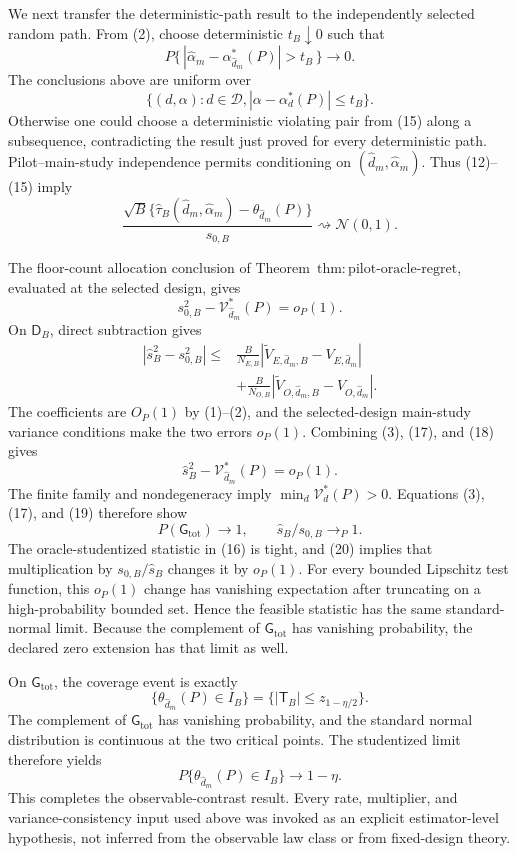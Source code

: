 We next transfer the deterministic-path result to the independently selected random path.  From (2), choose deterministic \(t_B\downarrow0\) such that
\[
 P\{\,|\widehat\alpha_m-\alpha_{\widehat d_m}^*(P)|>t_B\,\}
 \longrightarrow0.                                      \tag{14}
\]
The conclusions above are uniform over
\[
 \{(d,\alpha):d\in\mathcal D,
 |\alpha-\alpha_d^*(P)|\le t_B\}.                       \tag{15}
\]
Otherwise one could choose a deterministic violating pair from (15) along a subsequence, contradicting the result just proved for every deterministic path.  Pilot--main-study independence permits conditioning on \((\widehat d_m,\widehat\alpha_m)\).  Thus (12)--(15) imply
\[
 \frac{\sqrt B\{\widehat\tau_B(\widehat d_m,\widehat\alpha_m)
 -\theta_{\widehat d_m}(P)\}}{s_{0,B}}
 \rightsquigarrow\mathcal N(0,1).                       \tag{16}
\]

The floor-count allocation conclusion of Theorem~\(\mathrm{thm{:}pilot\text{-}oracle\text{-}regret}\), evaluated at the selected design, gives
\[
 s_{0,B}^2-\mathcal V_{\widehat d_m}^*(P)=o_P(1).        \tag{17}
\]
On \(\mathsf D_B\), direct subtraction gives
\[
\begin{aligned}
 |\widehat s_B^2-s_{0,B}^2|
 \le{}&\frac{B}{N_{E,B}}
 |\widetilde V_{E,\widehat d_m,B}-V_{E,\widehat d_m}|\\
 &+\frac{B}{N_{O,B}}
 |\widetilde V_{O,\widehat d_m,B}-V_{O,\widehat d_m}|. \tag{18}
\end{aligned}
\]
The coefficients are \(O_P(1)\) by (1)--(2), and the selected-design main-study variance conditions make the two errors \(o_P(1)\).  Combining (3), (17), and (18) gives
\[
 \widehat s_B^2-\mathcal V_{\widehat d_m}^*(P)=o_P(1).   \tag{19}
\]
The finite family and nondegeneracy imply \(\min_d\mathcal V_d^*(P)>0\).  Equations (3), (17), and (19) therefore show
\[
 P(\mathsf G_{\mathrm{tot}})\longrightarrow1,
 \qquad
 \widehat s_B/s_{0,B}\longrightarrow_P1.               \tag{20}
\]
The oracle-studentized statistic in (16) is tight, and (20) implies that multiplication by \(s_{0,B}/\widehat s_B\) changes it by \(o_P(1)\).  For every bounded Lipschitz test function, this \(o_P(1)\) change has vanishing expectation after truncating on a high-probability bounded set.  Hence the feasible statistic has the same standard-normal limit.  Because the complement of \(\mathsf G_{\mathrm{tot}}\) has vanishing probability, the declared zero extension has that limit as well.

On \(\mathsf G_{\mathrm{tot}}\), the coverage event is exactly
\[
 \{\theta_{\widehat d_m}(P)\in I_B\}
 =\{|\mathsf T_B|\le z_{1-\eta/2}\}.
\]
The complement of \(\mathsf G_{\mathrm{tot}}\) has vanishing probability, and the standard normal distribution is continuous at the two critical points.  The studentized limit therefore yields
\[
 P\{\theta_{\widehat d_m}(P)\in I_B\}\longrightarrow1-\eta.
\]
This completes the observable-contrast result.  Every rate, multiplier, and variance-consistency input used above was invoked as an explicit estimator-level hypothesis, not inferred from the observable law class or from fixed-design theory.